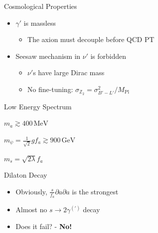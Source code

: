 \documentclass[17pt,ignorenonframetext,]{beamer}
\providecommand{\tightlist}{%
  \setlength{\itemsep}{0pt}\setlength{\parskip}{0pt}}
\begin{document}
\begin{frame}{Cosmological Properties}

\begin{itemize}
\tightlist
\item
  \(\gamma'\) is massless

  \begin{itemize}
  \tightlist
  \item
    The axion must decouple before QCD PT
  \end{itemize}
\item
  Seesaw mechanism in \(\nu'\) is forbidden

  \begin{itemize}
  \tightlist
  \item
    \(\nu'\)s have large Dirac mass
  \item
    No fine-tuning:
    \(\sigma_{\mathbb Z_2} = \sigma_{B'-L'}^2/M_\text{Pl}\)
  \end{itemize}
\end{itemize}

\end{frame}

\begin{frame}{Low Energy Spectrum}

\begin{description}
\tightlist
\item[Axion \(a\)\phantom{hogehogehogehogehoge}]
\(m_a\gtrsim 400\,\text{MeV}\)
\item[Vector like quark \(\psi, \psi'\)]
\(m_\psi=\frac{1}{\sqrt2}gf_a\gtrsim 900\,\text{GeV}\)
\item[Dilaton \(s\)\phantom{hogehogehoge}]
\(m_s=\sqrt{2\lambda}f_a\)
\end{description}

\end{frame}

\begin{frame}{Dilaton Decay}

\begin{itemize}
\tightlist
\item
  Obviously, \(\displaystyle\frac{s}{f_a}\partial a\partial a\) is the
  strongest
\item
  Almost no \(s\to2\gamma^{(\prime)}\) decay
\item
  Does it fail? \pause - \textbf{No!}
\end{itemize}

\end{frame}
\end{document}
